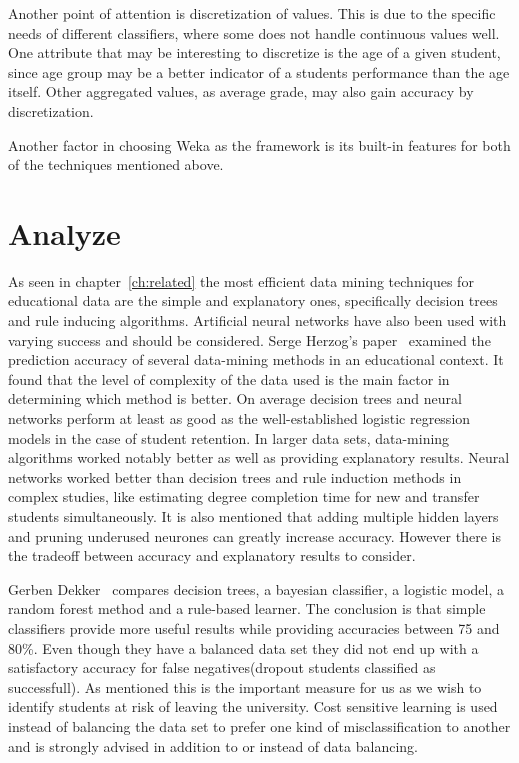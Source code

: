 \bigskip\noindent
Another point of attention is discretization of values. 
This is due to the specific needs of different classifiers, where some does not handle continuous values well. 
One attribute that may be interesting to discretize is the age of a given student, 
since age group may be a better indicator of a students performance than the age itself. 
Other aggregated values, as average grade, may also gain accuracy by discretization.

\bigskip\noindent
Another factor in choosing Weka as the framework is its built-in features for both of the techniques mentioned above. 

\section{Analyze}
As seen in chapter~\ref{ch:related} the most efficient data mining techniques for educational data are the simple and explanatory ones,
specifically decision trees and rule inducing algorithms.
Artificial neural networks have also been used with varying success and should be considered.
Serge Herzog's paper~\cite{2} examined the prediction accuracy of several data-mining methods in an educational context.
It found that the level of complexity of the data used is the main factor in determining which method is better.
On average decision trees and neural networks perform at least as good as the well-established logistic regression models in the case of student retention.
In larger data sets, data-mining algorithms worked notably better as well as providing explanatory results. 
Neural networks worked better than decision trees and rule induction methods in complex studies, like estimating degree completion time for new and transfer students simultaneously. 
It is also mentioned that adding multiple hidden layers and pruning underused neurones can greatly increase accuracy. 
However there is the tradeoff between accuracy and explanatory results to consider. 

\bigskip\noindent
Gerben Dekker~\cite{7} compares decision trees, a bayesian classifier, a logistic model, a random forest method and a rule-based learner.
The conclusion is that simple classifiers provide more useful results while providing accuracies between 75 and 80\%.
Even though they have a balanced data set they did not end up with a satisfactory accuracy for  false negatives(dropout students classified as successfull). As mentioned this is the important measure for us as we wish to identify students at risk of leaving the university. Cost sensitive learning is used instead of balancing the data set to prefer one kind of misclassification to another and is strongly advised in addition to or instead of data balancing.  

